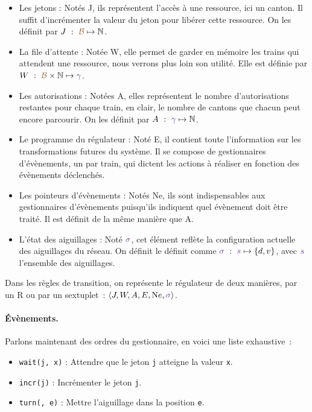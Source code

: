 \documentclass[oneside, a4paper, 11pt]{book}
\newcommand{\nats}{\ensuremath{\mathbb{N}}}
\newcommand{\trainFmt}[1]{{\color{traincolor} #1}}
\newcommand{\posFmt}[1]{{\color{poscolor}{#1}}}
\newcommand{\swFmt}[1]{{\color{swcolor}{#1}}}
\begin{document}
\begin{itemize}
	\item Les jetons : Notés J, ils représentent l'accès à une ressource, ici un canton. Il suffit d'incrémenter la valeur du jeton pour libérer cette ressource.
	 On les définit par $J~:~\posFmt{\mathcal{B}} \mapsto \nats$.
	\item La file d'attente : Notée W, elle permet de garder en mémoire les trains qui attendent une ressource, nous verrons plus loin son utilité. Elle est définie par $W~:~\posFmt{\mathcal{B}} \times \nats \mapsto \trainFmt{\gamma}$.
	\item Les autorisations : Notées A, elles représentent le nombre d'autorisations restantes pour chaque train, en clair, le nombre de cantons que chacun peut encore parcourir.
	 On les définit par $A~:~\trainFmt{\gamma} \mapsto \nats$.
	\item Le programme du régulateur : Noté E, il contient toute l'information sur les transformations futures du système. 
	 Il se compose de gestionnaires d'évènements, un par train, qui dictent les actions à réaliser en fonction des évènements déclenchés.
	\item Les pointeurs d'évènements : Notés Ne, ils sont indispensables aux gestionnaires d'évènements puisqu'ils indiquent quel évènement doit être traité. Il est définit de la même manière que A.
	\item L'état des aiguillages : Noté $\swFmt{\sigma}$, cet élément reflète la configuration actuelle des aiguillages du réseau. On définit le définit comme $\swFmt{\sigma}~:~\swFmt{s} \mapsto \{d, v\}$, avec $\swFmt{s}$ l'ensemble des aiguillages.
\end{itemize}
Dans les règles de transition, on représente le régulateur de deux manières, par un R ou par un sextuplet~: $\langle J,W,A,E,{\text Ne},\swFmt{\sigma} \rangle$.



\paragraph{Évènements.}
Parlons maintenant des ordres du gestionnaire, en voici une liste exhaustive~:
\begin{itemize}
	\item \texttt{wait(j, x)} : Attendre que le jeton \texttt{j} atteigne la valeur \texttt{x}.
	\item \texttt{incr(j)} : Incrémenter le jeton \texttt{j}.
	\item \texttt{turn(\swFmt{$s_i$}, e)} : Mettre l'aiguillage \swFmt{$s_i$} dans la position \texttt{e}.
\end{itemize}
\end{document}
